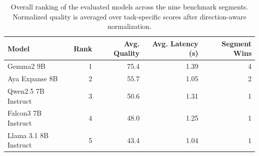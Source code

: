\begin{table}[t]
\centering
\caption{Overall ranking of the evaluated models across the nine benchmark segments. Normalized quality is averaged over task-specific scores after direction-aware normalization.}
\label{tab:overall-ranking}
\begin{tabular}{lrrrr}
\toprule
Model & Rank & Avg. Quality & Avg. Latency (s) & Segment Wins \\
\midrule
Gemma2 9B & 1 & 75.4 & 1.39 & 4 \\
Aya Expanse 8B & 2 & 55.7 & 1.05 & 2 \\
Qwen2.5 7B Instruct & 3 & 50.6 & 1.31 & 1 \\
Falcon3 7B Instruct & 4 & 48.0 & 1.25 & 1 \\
Llama 3.1 8B Instruct & 5 & 43.4 & 1.04 & 1 \\
\bottomrule
\end{tabular}
\end{table}